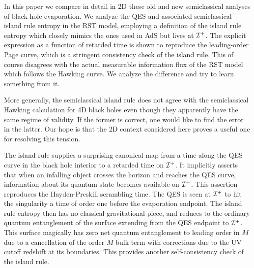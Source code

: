 \documentclass[12pt,oneside,letterpaper]{article}
\def\m{{M}}
\numberwithin{equation}{section}
\begin{document}
In this paper we compare in detail in 2D these old and new  semiclassical analyses of black hole evaporation. We  analyze the QES  and associated semiclassical island rule entropy in the  RST model, employing  a definition of the island rule entropy which closely mimics the ones used in AdS  \cite{Almheiri:2019qdq} but lives at ${\cal I}^+$. 
The  explicit expression as a function of retarded time is shown to  reproduce the leading-order Page curve, which   is a stringent consistency check of the island rule. This of course disagrees with the actual measurable  information flux of the RST model which follows the Hawking curve.   We analyze the difference  and try to learn something from it. 



More generally, the semiclassical island rule  does not agree with the semiclassical  Hawking calculation for 4D black holes even though they apparently have the same regime of validity. If the former is correct, one would like to find the error in the latter.  Our hope is that  the 2D context considered here proves a useful one for resolving this tension. 

The island rule supplies a surprising canonical map from a time along the QES  curve  in the black hole interior to a retarded time on ${\cal I}^+$.  It implicitly  asserts that when an infalling object crosses the horizon and reaches the QES curve, information about its quantum state becomes available on ${\cal I}^+$.  This assertion reproduces the Hayden-Preskill scrambling time. 
The QES is seen at ${\cal I}^+$ to hit the singularity a time of order one before the evaporation endpoint. The island rule entropy then has no classical gravitational piece, and reduces to the ordinary quantum entanglement of the surface extending from the QES endpoint to 
${\cal I}^+$. This surface magically has zero net quantum entanglement to leading order in $\m$ due to a cancellation of the order $\m$ bulk term with corrections due to the UV cutoff redshift at its boundaries. This 
provides another self-consistency check of the island rule. 
\end{document}
